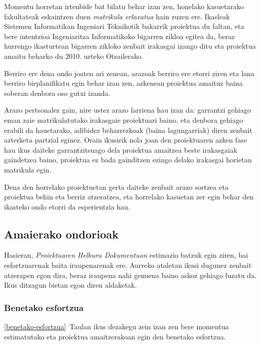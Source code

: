Momentu horretan irtenbide bat bilatu behar izan zen, honelako kasuetarako fakultateak eskaintzen duen \textit{matrikula erlaxatua} hain zuzen ere. Ikasleak Sistemen Informatikan Ingeniari Teknikotik bakarrik proiektua du faltan, eta bere intentzioa Ingeniaritza Informatikoko bigarren zikloa egitea da, beraz hurrengo ikasturtean bigarren zikloko zenbait irakasgai izango ditu eta proiektua amaitu beharko du 2010. urteko Otsailerako.

Berriro ere dena ondo joaten ari zenean, arazoak berriro ere etorri ziren eta lana berriro birplanifikatu egin behar izan zen, azkenean proiektua amaituz baina soberan denbora oso gutxi izanda.

Arazo pertsonalez gain, nire ustez arazo larriena hau izan da: garrantzi gehiago eman zaie matrikulatutako irakasgaie proiektuari baino, eta denbora gehiago erabili da hauetarako, adibidez beharrezkoak (baina lagungarriak) diren zenbait azterketa partzial eginez. Orain ikusirik nola joan den proiektuaren azken fase hau ikus daiteke garrantzitsuago dela proiektua amaitzea beste irakasgaiak gaindetzea baino, proiektua ez bada gainditzen ezingo delako irakasgai horietan matrikula egin.

Dena den horrelako proiektuetan gerta daiteke zenbait arazo sortzea eta proiektua behin eta berriz atzeratzea, eta horrelako kasuetan zer egin behar den ikasteko ondo etorri da esperientzia hau.

\subsection{Amaierako ondorioak}
Hasieran, \textit{Proiektuaren Helburu Dokumentuan} estimazio batzuk egin ziren, bai esfortzuarenak baita iraupenarenak ere. Aurreko ataletan ikusi dugunez zenbait atzerapen egon dira, beraz iraupena nahi genuena baino askoz gehiago luzatu da. Ikus ditzagun bietan egon diren aldaketak.

\subsubsection{Benetako esfortzua}
\ref{benetako-esfortzua}~Taulan ikus dezakegu zein izan zen bere momentua estimatutako eta proiektua amaitzerakoan egin den benetako esfortzua.

